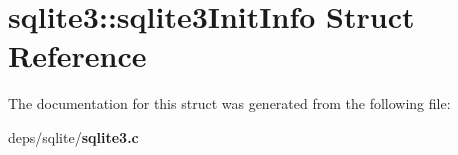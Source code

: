 \section{sqlite3::sqlite3Init\-Info Struct Reference}
\label{structsqlite3_1_1sqlite3InitInfo}


The documentation for this struct was generated from the following file:\begin{CompactItemize}
\item 
deps/sqlite/\bf{sqlite3.c}\end{CompactItemize}
